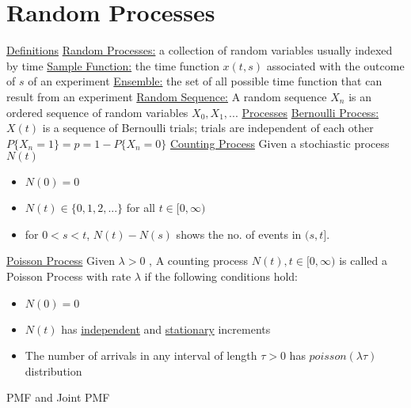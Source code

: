 \documentclass{article}
\begin{document}
	\section{Random Processes}
	\underline{Definitions}
	\newline
	\underline{Random Processes:} a collection of random variables usually indexed by time
	\newline
	\underline{Sample Function:} the time function  $x(t, s)$ associated with the outcome of $s$ of an experiment
	\newline
	\underline{Ensemble:} the set of all possible time function that can result from an experiment
	\newline
	\underline{Random Sequence:} A random sequence $X_n$ is an ordered sequence of random variables $X_0, X_1, ...$ 
	\newline
	\newline
	\underline{Processes}
	\newline
	\underline{Bernoulli Process:} $X(t)$ is a sequence of Bernoulli trials; trials are independent of each other
	\newline
	$P\{X_n = 1\} = p = 1 - P\{X_n = 0\}$
	\newline
	\underline{Counting Process} Given a stochiastic process $N(t)$
	\begin{itemize}
		\item $N(0) = 0$
		\item $N(t) \in \{0, 1, 2,...\}$ for all $t \in [0, \infty)$
		\item for $0 < s < t$, $N(t) - N(s)$ shows the no. of events in $(s,t]$.
	\end{itemize}
	\underline{Poisson Process} Given $\lambda > 0$ , A counting process $N(t), t \in [0, \infty)$ is called a Poisson Process with rate $\lambda$ if the following conditions hold:
	\begin{itemize}
		\item $N(0) = 0$
		\item $N(t)$ has \underline{independent} and \underline{stationary} increments
		\item The number of arrivals in any interval of length $\tau > 0$ has $poisson(\lambda\tau)$ distribution
	\end{itemize}
	PMF and Joint PMF
	\newline
\end{document}
